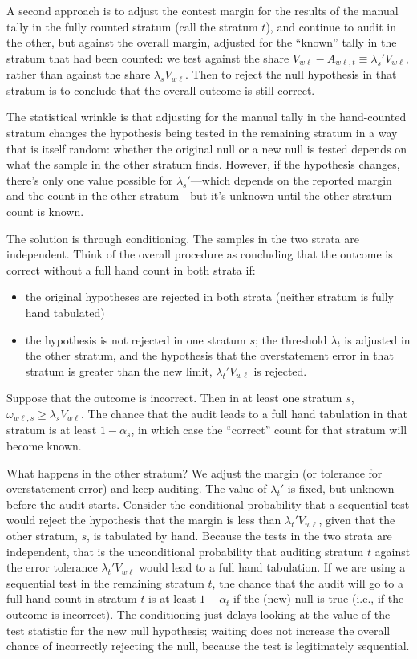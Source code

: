 A second approach is to adjust the contest margin for the results of the manual tally in the
fully counted stratum (call the stratum $t$), and continue to audit in the other, 
but against the overall margin, adjusted for the ``known'' tally in the stratum that had 
been counted: we test against the share $V_{w\ell} - A_{w\ell,t} \equiv \lambda_s' V_{w\ell}$, rather than 
against the share $\lambda_s V_{w\ell}$.
Then to reject the null hypothesis in that stratum is to conclude that the overall outcome is still correct.

The statistical wrinkle is that adjusting for the manual tally in the hand-counted stratum 
changes the hypothesis being tested in the remaining
stratum in a way that is itself random:
whether the original null or a new null is tested depends on what the sample in the other stratum
finds.
However, if the hypothesis changes, there's only one value possible for $\lambda_s'$---which
depends on the reported margin and the count in the other stratum---but it's unknown 
until the other stratum count is known.

The solution is through conditioning. 
The samples in the two strata are independent. 
Think of the overall procedure as concluding that the outcome is correct without a full
hand count in both strata if:

\begin{itemize}
   \item the original hypotheses are rejected in both strata (neither stratum is fully hand tabulated)
   \item the hypothesis is not rejected in one stratum $s$; the threshold $\lambda_t$
            is adjusted in the other stratum, and the hypothesis that the overstatement error
            in that stratum is greater than the new limit, $\lambda_t' V_{w\ell}$ is rejected. 
\end{itemize}

Suppose that the outcome is incorrect. 
Then in at least one stratum $s$, $\omega_{w\ell,s}\ge \lambda_s V_{w\ell}$.
The chance that the audit leads to a full hand tabulation in that stratum is at least $1-\alpha_s$,
in which case the ``correct'' count for that stratum will become known.

What happens in the other stratum?
We adjust the margin (or tolerance for overstatement error) and keep auditing.
The value of $\lambda_t'$ is fixed, but unknown before the audit starts.
Consider the conditional probability that a sequential test would reject the hypothesis that the margin is less than $\lambda_t' V_{w\ell}$, given that the other stratum, $s$, is tabulated by hand.
Because the tests in the two strata are independent, that is the unconditional probability
that auditing stratum $t$ against the error tolerance $\lambda_t' V_{w\ell}$ would lead to a full
hand tabulation. 
If we are using a sequential test in the remaining stratum $t$, the chance that the audit will
go to a full hand count in stratum $t$ is at least $1-\alpha_t$ if the (new) null is true (i.e.,
if the outcome is incorrect). 
The conditioning just delays looking at the value of the test statistic for the new null hypothesis; waiting does not increase the overall chance of incorrectly rejecting the null, 
because the test is legitimately sequential.

